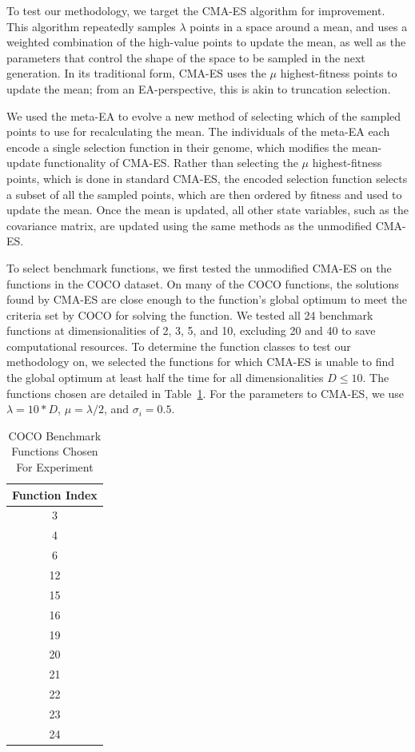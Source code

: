 \documentclass[sigconf]{acmart}
\begin{document}
To test our methodology, we target the CMA-ES algorithm for improvement. This algorithm repeatedly samples $\lambda$ points in a space around a mean, and uses a weighted combination of the high-value points to update the mean, as well as the parameters that control the shape of the space to be sampled in the next generation. In its traditional form, CMA-ES uses the $\mu$ highest-fitness points to update the mean; from an EA-perspective, this is akin to truncation selection. 

We used the meta-EA to evolve a new method of selecting which of the sampled points to use for recalculating the mean. The individuals of the meta-EA each encode a single selection function in their genome, which modifies the mean-update functionality of CMA-ES. Rather than selecting the $\mu$ highest-fitness points, which is done in standard CMA-ES, the encoded selection function selects a subset of all the sampled points, which are then ordered by fitness and used to update the mean. Once the mean is updated, all other state variables, such as the covariance matrix, are updated using the same methods as the unmodified CMA-ES.

To select benchmark functions, we first tested the unmodified CMA-ES on the functions in the COCO dataset. On many of the COCO functions, the solutions found by CMA-ES are close enough to the function's global optimum to meet the criteria set by COCO for solving the function. We tested all 24 benchmark functions at dimensionalities of 2, 3, 5, and 10, excluding 20 and 40 to save computational resources. To determine the function classes to test our methodology on, we selected the functions for which CMA-ES is unable to find the global optimum at least half the time for all dimensionalities $D\leq10$. The functions chosen are detailed in Table~\ref{tab:experiment3chosenFunctions}. For the parameters to CMA-ES, we use $\lambda=10*D$, $\mu = \lambda/2$, and $\sigma_i = 0.5$. 

\begin{table}
	\centering
	\caption{COCO Benchmark Functions Chosen For Experiment}
	\label{tab:experiment3chosenFunctions}
	\begin{tabular}{c}
		\toprule
		Function Index \\
		\midrule
		3 \\
		\hline
		4 \\
		\hline
		6\\
		\hline
		12\\
		\hline
		15\\
		\hline
		16\\
		\hline
		19\\
		\hline
		20\\
		\hline
		21\\
		\hline
		22\\
		\hline
		23\\
		\hline
		24\\                        
		
		\bottomrule
	\end{tabular}
\end{table}
\end{document}
